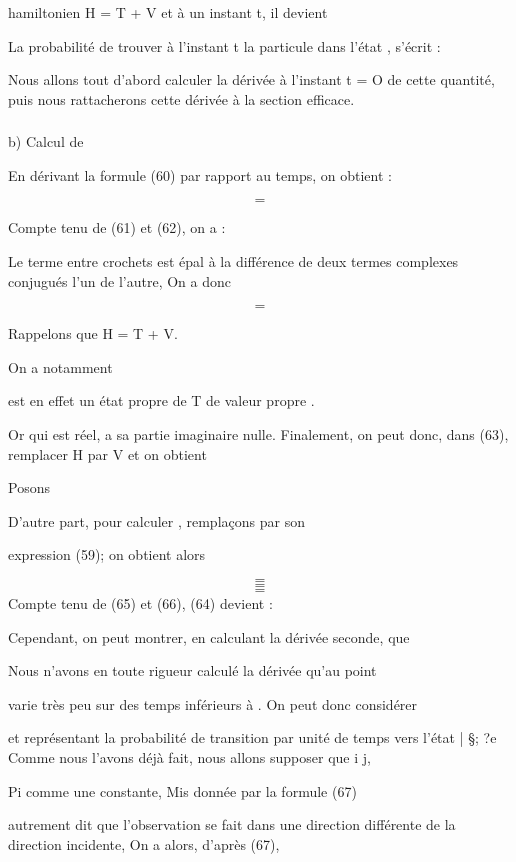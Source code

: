 {{{hamiltonien H = T + V et à un instant t, il devient

La probabilité de trouver à l'instant t la particule dans l'état ,
 s'écrit :


Nous allons tout d'abord calculer la dérivée à l'instant t = O de cette
quantité, puis nous rattacherons cette dérivée à la section efficace.

 

\subsubsection{}%
b) Calcul de 

En dérivant la formule (60) par rapport au temps, on obtient :

\[
\tag{62}=
\]

Compte tenu de (61) et (62), on a :

Le terme entre crochets est épal à la différence de deux termes complexes
conjugués l'un de l'autre, On a donc

\[
\tag{63}=
\]

Rappelons que H = T + V.

On a notamment

 est en effet un état propre de T de valeur propre .

Or  qui est réel, a sa partie imaginaire nulle.
Finalement, on peut donc, dans (63), remplacer H par V et on obtient

Posons

D'autre part, pour calculer , remplaçons  par son

expression (59); on obtient alors


\[
\tag{66}=
\]
\[
\tag{67}=
\]
\[
\tag{68}=
\]
Compte tenu de (65) et (66), (64) devient :

 Cependant, on peut montrer, en calculant la dérivée seconde, que

Nous n'avons en toute rigueur calculé la dérivée  qu'au point

 varie très peu sur des temps inférieurs à . On peut donc considérer


et représentant la probabilité de transition par unité de temps vers
l'état | \S; ?e
Comme nous l'avons déjà fait, nous allons supposer que i  j,

Pi comme une constante, Mis donnée par la formule (67)

autrement dit que l'observation se fait dans une direction différente de
la direction incidente, On a alors, d'après (67),

}}}
